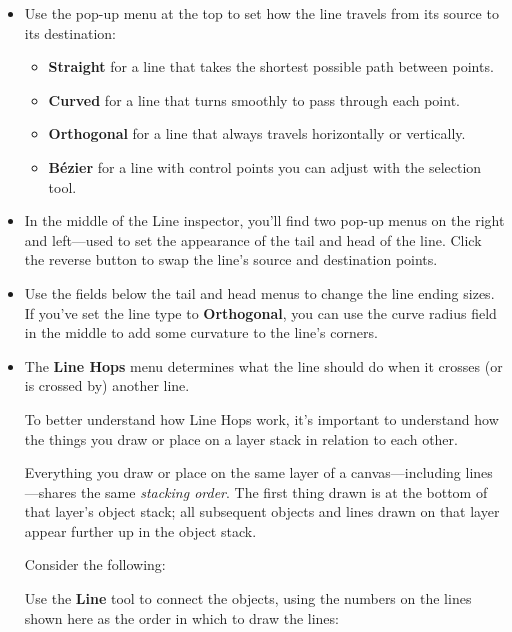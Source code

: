 \documentclass[../main.tex]{subfiles}
\begin{document}
\begin{itemize}
  \item Use the pop-up menu at the top to set how the line travels from its source to its
    destination:

    \begin{itemize}
      \item \textbf{Straight} for a line that takes the shortest possible path between points.
      \item \textbf{Curved} for a line that turns smoothly to pass through each point.
      \item \textbf{Orthogonal} for a line that always travels horizontally or vertically.
      \item \textbf{Bézier} for a line with control points you can adjust with the selection tool.
    \end{itemize}
  \item In the middle of the Line inspector, you'll find two pop-up menus on the right and
    left---used to set the appearance of the tail and head of the line. Click the reverse button
    to swap the line's source and destination points.
  \item Use the fields below the tail and head menus to change the line ending sizes. If you've
    set the line type to \textbf{Orthogonal}, you can use the curve radius field in the middle
    to add some curvature to the line's corners.
  \item The \textbf{Line Hops} menu determines what the line should do when it crosses (or is
    crossed by) another line.

    To better understand how Line Hops work, it's important to understand how the things you draw
    or place on a layer stack in relation to each other.

    Everything you draw or place on the same layer of a canvas---including lines---shares the same
    \textit{stacking order}. The first thing drawn is at the bottom of that layer's object
    stack; all subsequent objects and lines drawn on that layer appear further up in the object
    stack.

    Consider the following:


    Use the \textbf{Line} tool to connect the objects, using the numbers on the lines shown here
    as the order in which to draw the lines:



\end{itemize}
\end{document}
